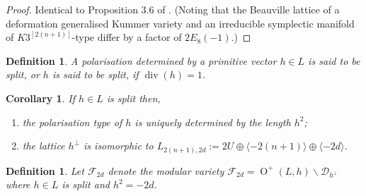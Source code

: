 \documentclass[11pt]{amsart}
\newtheorem{cor}[thm]{Corollary}
\newtheorem{defn}[thm]{Definition}
\newcommand{\dc}{\mathcal{D}}
\newcommand{\la}{\langle}
\newcommand{\ra}{\rangle}
\newcommand{\opn}{\operatorname}
\newcommand{\op}{\oplus}
\newcommand{\fc}{\mathcal{F}}
\begin{document}
\begin{proof}
Identical to Proposition 3.6 of \cite{ModuliSpacesOfIrreducibleSymplecticManifolds}.
(Noting that the Beauville lattice of a deformation generalised Kummer variety and an irreducible symplectic manifold of $K3^{[2(n+1)]}$-type differ by a factor of $2E_8(-1)$.) 
\end{proof}
\begin{defn}
A polarisation determined by a primitive vector $h \in L$ is said to be \emph{split}, or $h$ is said to be \emph{split}, if $\opn{div}(h)=1$.
\end{defn}
\begin{cor}
If $h \in L$ is split then,
\begin{enumerate}
\item the polarisation type of $h$ is uniquely determined by the length $h^2$;
\item the lattice $h^{\perp}$ is isomorphic to $L_{2(n+1), 2d}:=2U \op \la -2(n+1) \ra \op \la -2d \ra$.
\end{enumerate}
\end{cor}
\begin{defn}
Let $\fc_{2d}$ denote the modular variety $\fc_{2d} = \opn{O}^+(L, h) \backslash \dc_{h^{\perp}}$ where $h \in L$ is split and $h^2 = -2d$.
\end{defn}
\end{document}
